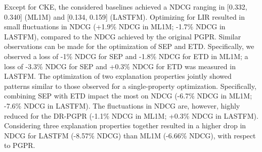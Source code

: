 \documentclass[sigconf]{acmart}
\begin{document}
Except for CKE, the considered baselines achieved a NDCG ranging in [0.332, 0.340] (ML1M) and [0.134, 0.159] (LASTFM).
Optimizing for LIR resulted in small fluctuations in NDCG (+1.9\% NDCG in ML1M; -1.7\% NDCG in LASTFM), compared to the NDCG achieved by the original PGPR. Similar observations can be made for the optimization of SEP and ETD.
Specifically, we observed a loss of -1\% NDCG for SEP and -1.8\% NDCG for ETD in ML1M; a loss of -3.3\% NDCG for SEP and +0.3\% NDCG for ETD was measured in LASTFM. 
The optimization of two explanation properties jointly showed patterns similar to those observed for a single-property optimization.  
Specifically, combining SEP with ETD impact the most on NDCG (-6.7\% NDCG in ML1M; -7.6\% NDCG in LASTFM). 
The fluctuations in NDCG are, however, highly reduced for the DR-PGPR (-1.1\% NDCG in ML1M; +0.3\% NDCG in LASTFM).
Considering three explanation properties together resulted in a higher drop in NDCG for LASTFM (-8.57\% NDCG) than ML1M (-6.66\% NDCG), with respect to PGPR.

\begin{table}[!t]
\centering
  \caption{Recommendation utility (NDCG).}
  \label{tab:baselines-results}
\end{table}
\end{document}
